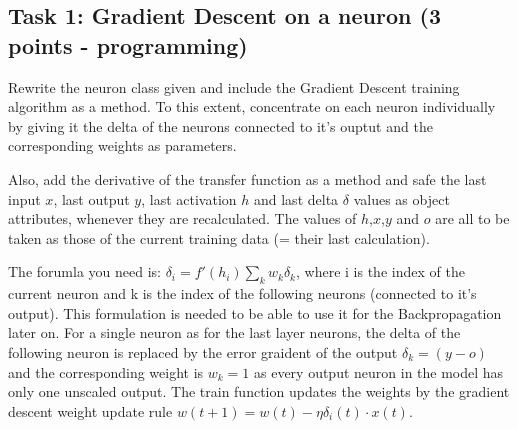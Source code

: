 \documentclass[11pt]{article}
\begin{document}
    \subsection{Task 1: Gradient Descent on a neuron (3 points -
programming)}\label{task-1-gradient-descent-on-a-neuron-3-points---programming}

Rewrite the neuron class given and include the Gradient Descent training
algorithm as a method. To this extent, concentrate on each neuron
individually by giving it the delta of the neurons connected to it's
ouptut and the corresponding weights as parameters.

Also, add the derivative of the transfer function as a method and safe
the last input \(x\), last output \(y\), last activation \(h\) and last
delta \(\delta\) values as object attributes, whenever they are
recalculated. The values of \(h\),\(x\),\(y\) and \(o\) are all to be
taken as those of the current training data (= their last calculation).

The forumla you need is: \(\delta_i = f'(h_i) \sum_k w_k \delta_k\),
where i is the index of the current neuron and k is the index of the
following neurons (connected to it's output). This formulation is needed
to be able to use it for the Backpropagation later on. For a single
neuron as for the last layer neurons, the delta of the following neuron
is replaced by the error graident of the output
\(\delta_k=\left(y-o\right)\) and the corresponding weight is \(w_k=1\)
as every output neuron in the model has only one unscaled output. The
train function updates the weights by the gradient descent weight update
rule \(w(t+1)=w(t)-\eta\delta_i(t)\cdot x(t)\).
\end{document}
